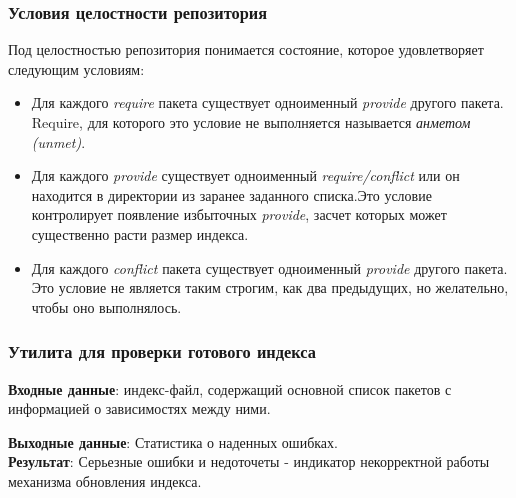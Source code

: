 \documentclass{beamer}
\begin{document}
\begin{frame}
\frametitle{Условия целостности репозитория}
Под целостностью
репозитория понимается состояние, которое удовлетворяет следующим
условиям:
\begin{itemize}
\item{Для каждого \textit{require} пакета существует одноименный \textit{provide} 
другого пакета. Require, для которого это условие не выполняется
называется \textit{анметом (unmet)}. }
\item{Для каждого \textit{provide} существует одноименный \textit{require/conflict} или
он находится в директории из заранее заданного списка.Это условие 
контролирует появление избыточных \textit{provide}, засчет которых
может существенно расти размер индекса.}
\item{Для каждого \textit{conflict} пакета существует одноименный \textit{provide} 
другого пакета. Это условие не является таким строгим, как два предыдущих,
но желательно, чтобы оно выполнялось. }
\end{itemize}
\end{frame}

\begin{frame}
\frametitle{Утилита для проверки готового индекса}
\textbf{Входные данные}: индекс-файл, содержащий основной
список пакетов с информацией о 
зависимостях между ними.\\

\vspace{1cm}

\textbf{Выходные данные}: Статистика о наденных ошибках.\\
\vspace{1cm}
\textbf{Результат}: Серьезные ошибки и недоточеты - индикатор некорректной работы механизма обновления индекса.
\end{frame}
\end{document}
